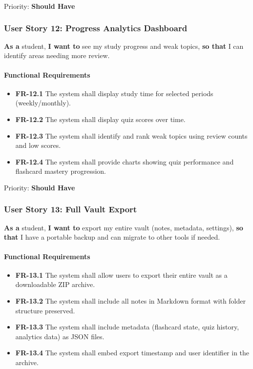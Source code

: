 \documentclass[12pt,a4paper]{article}
\begin{document}
Priority: \textbf{Should Have}

\subsubsection{User Story 12: Progress Analytics Dashboard}

\textbf{As a} student, \textbf{I want to} see my study progress and weak topics, \textbf{so that} I can identify areas needing more review.

\paragraph{Functional Requirements}

\begin{itemize}
    \item \textbf{FR-12.1} The system shall display study time for selected periods (weekly/monthly).
    \item \textbf{FR-12.2} The system shall display quiz scores over time.
    \item \textbf{FR-12.3} The system shall identify and rank weak topics using review counts and low scores.
    \item \textbf{FR-12.4} The system shall provide charts showing quiz performance and flashcard mastery progression.
\end{itemize}

Priority: \textbf{Should Have}

\subsubsection{User Story 13: Full Vault Export}

\textbf{As a} student, \textbf{I want to} export my entire vault (notes, metadata, settings), \textbf{so that} I have a portable backup and can migrate to other tools if needed.

\paragraph{Functional Requirements}

\begin{itemize}
    \item \textbf{FR-13.1} The system shall allow users to export their entire vault as a downloadable ZIP archive.
    \item \textbf{FR-13.2} The system shall include all notes in Markdown format with folder structure preserved.
    \item \textbf{FR-13.3} The system shall include metadata (flashcard state, quiz history, analytics data) as JSON files.
    \item \textbf{FR-13.4} The system shall embed export timestamp and user identifier in the archive.
\end{itemize}
\end{document}
